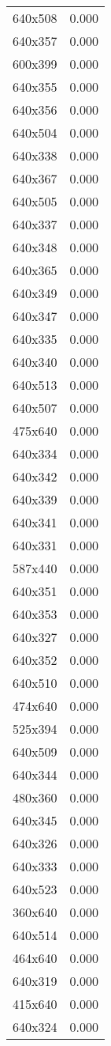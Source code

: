 \begin{table}
\begin{tabular}{lr}
640x508 & 0.000 \\
640x357 & 0.000 \\
600x399 & 0.000 \\
640x355 & 0.000 \\
640x356 & 0.000 \\
640x504 & 0.000 \\
640x338 & 0.000 \\
640x367 & 0.000 \\
640x505 & 0.000 \\
640x337 & 0.000 \\
640x348 & 0.000 \\
640x365 & 0.000 \\
640x349 & 0.000 \\
640x347 & 0.000 \\
640x335 & 0.000 \\
640x340 & 0.000 \\
640x513 & 0.000 \\
640x507 & 0.000 \\
475x640 & 0.000 \\
640x334 & 0.000 \\
640x342 & 0.000 \\
640x339 & 0.000 \\
640x341 & 0.000 \\
640x331 & 0.000 \\
587x440 & 0.000 \\
640x351 & 0.000 \\
640x353 & 0.000 \\
640x327 & 0.000 \\
640x352 & 0.000 \\
640x510 & 0.000 \\
474x640 & 0.000 \\
525x394 & 0.000 \\
640x509 & 0.000 \\
640x344 & 0.000 \\
480x360 & 0.000 \\
640x345 & 0.000 \\
640x326 & 0.000 \\
640x333 & 0.000 \\
640x523 & 0.000 \\
360x640 & 0.000 \\
640x514 & 0.000 \\
464x640 & 0.000 \\
640x319 & 0.000 \\
415x640 & 0.000 \\
640x324 & 0.000 \\

\end{tabular}
\end{table}
